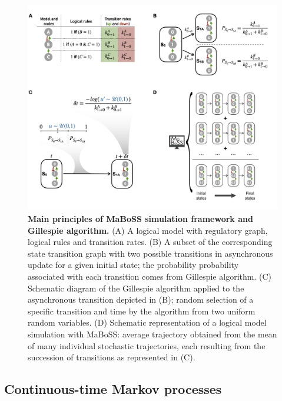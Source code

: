 \documentclass[a4paper,12pt,twoside,onecolumn,openright,final,oldfontcommands]{memoir}
\begin{document}
\begin{figure}

{\centering \includegraphics[width=1\linewidth]{fig/maboss} 

}

\caption[Main principles of MaBoSS simulation framework and Gillespie algorithm]{\textbf{Main principles of MaBoSS simulation
framework and Gillespie algorithm.} (A) A logical model with regulatory
graph, logical rules and transition rates. (B) A subset of the
corresponding state transition graph with two possible transitions in
asynchronous update for a given initial state; the probability
probability associated with each transition comes from Gillespie
algorithm. (C) Schematic diagram of the Gillespie algorithm applied to
the asynchronous transition depicted in (B); random selection of a
specific transition and time by the algorithm from two uniform random
variables. (D) Schematic representation of a logical model simulation
with MaBoSS: average trajectory obtained from the mean of many
individual stochastic trajectories, each resulting from the succession
of transitions as represented in (C).}\label{fig:maboss}
\end{figure}















\subsection{Continuous-time Markov
processes}\label{continuous-time-markov-processes}
\end{document}
